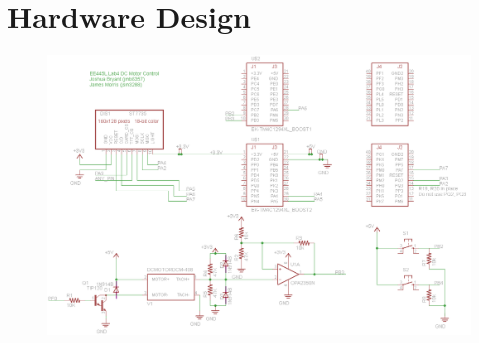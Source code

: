 \documentclass{article}
\begin{document}
\section{Hardware Design}
	\begin{figure}[h]
		\includegraphics[keepaspectratio, width=\textwidth]{Lab4Graphics/finalSchematic.png}
	\end{figure}


\end{document}

